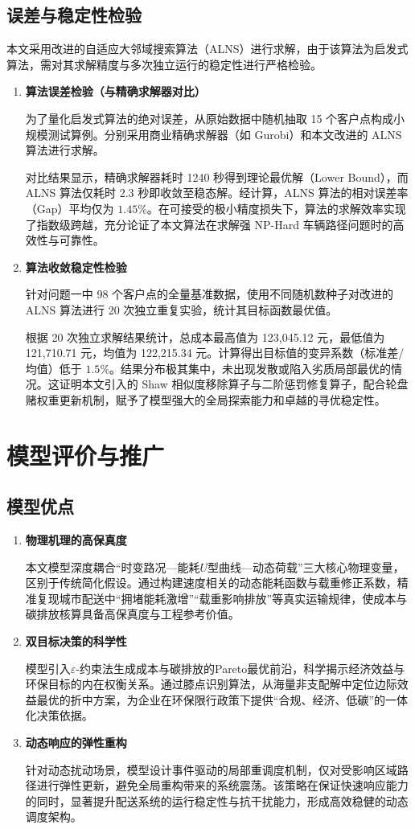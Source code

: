 \documentclass[12pt,a4paper]{article}
\begin{document}
\subsection{误差与稳定性检验}
本文采用改进的自适应大邻域搜索算法（ALNS）进行求解，由于该算法为启发式算法，需对其求解精度与多次独立运行的稳定性进行严格检验。
\begin{enumerate}
    \item \textbf{算法误差检验（与精确求解器对比）}

为了量化启发式算法的绝对误差，从原始数据中随机抽取 15 个客户点构成小规模测试算例。分别采用商业精确求解器（如 Gurobi）和本文改进的 ALNS 算法进行求解。

对比结果显示，精确求解器耗时 1240 秒得到理论最优解（Lower Bound），而 ALNS 算法仅耗时 2.3 秒即收敛至稳态解。经计算，ALNS 算法的相对误差率（Gap）平均仅为 $1.45\%$。在可接受的极小精度损失下，算法的求解效率实现了指数级跨越，充分论证了本文算法在求解强 NP-Hard 车辆路径问题时的高效性与可靠性。
    \item \textbf{算法收敛稳定性检验}
    
针对问题一中 98 个客户点的全量基准数据，使用不同随机数种子对改进的 ALNS 算法进行 20 次独立重复实验，统计其目标函数最优值。

根据 20 次独立求解结果统计，总成本最高值为 123,045.12 元，最低值为 121,710.71 元，均值为 122,215.34 元。计算得出目标值的变异系数（标准差/均值）低于 $1.5\%$。结果分布极其集中，未出现发散或陷入劣质局部最优的情况。这证明本文引入的 Shaw 相似度移除算子与二阶惩罚修复算子，配合轮盘赌权重更新机制，赋予了模型强大的全局探索能力和卓越的寻优稳定性。
\end{enumerate}

\section{模型评价与推广}
\subsection{模型优点}
\begin{enumerate}
    \item \textbf{物理机理的高保真度}

    本文模型深度耦合“时变路况—能耗$U$型曲线—动态荷载”三大核心物理变量，区别于传统简化假设。通过构建速度相关的动态能耗函数与载重修正系数，精准复现城市配送中“拥堵能耗激增”“载重影响排放”等真实运输规律，使成本与碳排放核算具备高保真度与工程参考价值。
    
    \item \textbf{双目标决策的科学性}

    模型引入$\varepsilon$-约束法生成成本与碳排放的Pareto最优前沿，科学揭示经济效益与环保目标的内在权衡关系。通过膝点识别算法，从海量非支配解中定位边际效益最优的折中方案，为企业在环保限行政策下提供“合规、经济、低碳”的一体化决策依据。

    \item \textbf{动态响应的弹性重构}
    
    针对动态扰动场景，模型设计事件驱动的局部重调度机制，仅对受影响区域路径进行弹性更新，避免全局重构带来的系统震荡。该策略在保证快速响应能力的同时，显著提升配送系统的运行稳定性与抗干扰能力，形成高效稳健的动态调度架构。
\end{enumerate}
\end{document}
